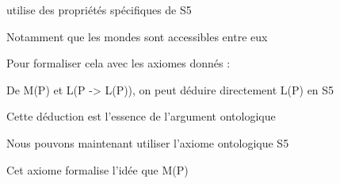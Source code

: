 \documentclass[10pt]{report}
\begin{document}
\begin{coqdoccode}
\begin{coqdoccomment}
utilise\coqdocindent{0.50em}
des\coqdocindent{0.50em}
propriétés\coqdocindent{0.50em}
spécifiques\coqdocindent{0.50em}
de\coqdocindent{0.50em}
S5\coqdocindent{0.50em}
\end{coqdoccomment}
\coqdoceol
\coqdocindent{2.00em}
\begin{coqdoccomment}
\coqdocindent{0.50em}
Notamment\coqdocindent{0.50em}
que\coqdocindent{0.50em}
les\coqdocindent{0.50em}
mondes\coqdocindent{0.50em}
sont\coqdocindent{0.50em}
accessibles\coqdocindent{0.50em}
entre\coqdocindent{0.50em}
eux\coqdocindent{0.50em}
\end{coqdoccomment}
\coqdoceol
\coqdocemptyline
\coqdocindent{2.00em}
\begin{coqdoccomment}
\coqdocindent{0.50em}
Pour\coqdocindent{0.50em}
formaliser\coqdocindent{0.50em}
cela\coqdocindent{0.50em}
avec\coqdocindent{0.50em}
les\coqdocindent{0.50em}
axiomes\coqdocindent{0.50em}
donnés\coqdocindent{0.50em}
:\coqdocindent{0.50em}
\end{coqdoccomment}
\coqdoceol
\coqdocindent{2.00em}
\begin{coqdoccomment}
\coqdocindent{0.50em}
De\coqdocindent{0.50em}
M(P)\coqdocindent{0.50em}
et\coqdocindent{0.50em}
L(P\coqdocindent{0.50em}
->\coqdocindent{0.50em}
L(P)),\coqdocindent{0.50em}
on\coqdocindent{0.50em}
peut\coqdocindent{0.50em}
déduire\coqdocindent{0.50em}
directement\coqdocindent{0.50em}
L(P)\coqdocindent{0.50em}
en\coqdocindent{0.50em}
S5\coqdocindent{0.50em}
\end{coqdoccomment}
\coqdoceol
\coqdocindent{2.00em}
\begin{coqdoccomment}
\coqdocindent{0.50em}
Cette\coqdocindent{0.50em}
déduction\coqdocindent{0.50em}
est\coqdocindent{0.50em}
l'essence\coqdocindent{0.50em}
de\coqdocindent{0.50em}
l'argument\coqdocindent{0.50em}
ontologique\coqdocindent{0.50em}
\end{coqdoccomment}
\coqdoceol
\coqdocemptyline
\coqdocindent{2.00em}
\begin{coqdoccomment}
\coqdocindent{0.50em}
Nous\coqdocindent{0.50em}
pouvons\coqdocindent{0.50em}
maintenant\coqdocindent{0.50em}
utiliser\coqdocindent{0.50em}
l'axiome\coqdocindent{0.50em}
ontologique\coqdocindent{0.50em}
S5\coqdocindent{0.50em}
\end{coqdoccomment}
\coqdoceol
\coqdocindent{2.00em}
\begin{coqdoccomment}
\coqdocindent{0.50em}
Cet\coqdocindent{0.50em}
axiome\coqdocindent{0.50em}
formalise\coqdocindent{0.50em}
l'idée\coqdocindent{0.50em}
que\coqdocindent{0.50em}
M(P)\coqdocindent{0.50em}

\end{coqdoccomment}
\end{coqdoccode}
\end{document}
